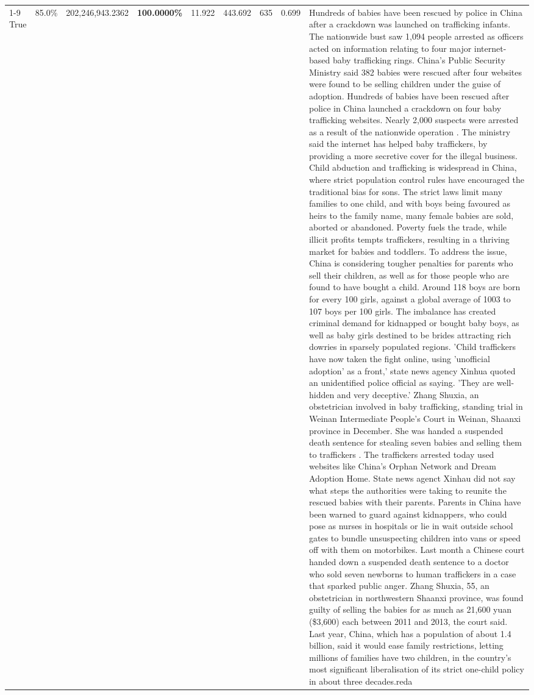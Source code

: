 \begin{table}[H]
\begin{tabular}{lllrlllll}
\cline{1-9}
True & 85.0\% & 202,246,943.2362 & \bfseries \color{red} 100.0000\% & 11.922 & 443.692 & 635 & 0.699 & Hundreds of babies have been rescued by police in China after a crackdown was launched on trafficking infants. The nationwide bust saw 1,094 people arrested as officers acted on information relating to four major internet-based baby trafficking rings. China's Public Security Ministry said 382 babies were rescued after four websites were found to be selling children under the guise of adoption. Hundreds of babies have been rescued after police in China launched a crackdown on four baby trafficking websites. Nearly 2,000 suspects were arrested as a result of the nationwide operation . The ministry said the internet has helped baby traffickers, by providing a more secretive cover for the illegal business. Child abduction and trafficking is widespread in China, where strict population control rules have encouraged the traditional bias for sons. The strict laws limit many families to one child, and with boys being favoured as heirs to the family name, many female babies are sold, aborted or abandoned. Poverty fuels the trade, while illicit profits tempts traffickers, resulting in a thriving market for babies and toddlers. To address the issue, China is considering tougher penalties for parents who sell their children, as well as for those people who are found to have bought a child. Around 118 boys are born for every 100 girls, against a global average of 1003 to 107 boys per 100 girls. The imbalance has created criminal demand for kidnapped or bought baby boys, as well as baby girls destined to be brides attracting rich dowries in sparsely populated regions. 'Child traffickers have now taken the fight online, using 'unofficial adoption' as a front,' state news agency Xinhua quoted an unidentified police official as saying. 'They are well-hidden and very deceptive.' Zhang Shuxia, an obstetrician involved in baby trafficking, standing trial in Weinan Intermediate People's Court in Weinan, Shaanxi province in December. She was handed a suspended death sentence for stealing seven babies and selling them to traffickers . The traffickers arrested today used websites like China's Orphan Network and Dream Adoption Home. State news agenct Xinhau did not say what steps the authorities were taking to reunite the rescued babies with their parents. Parents in China have been warned to guard against kidnappers, who could pose as nurses in hospitals or lie in wait outside school gates to bundle unsuspecting children into vans or speed off with them on motorbikes. Last month a Chinese court handed down a suspended death sentence to a doctor who sold seven newborns to human traffickers in a case that sparked public anger. Zhang Shuxia, 55, an obstetrician in northwestern Shaanxi province, was found guilty of selling the babies for as much as 21,600 yuan (\$3,600) each between 2011 and 2013, the court said. Last year, China, which has a population of about 1.4 billion, said it would ease family restrictions, letting millions of families have two children, in the country's most significant liberalisation of its strict one-child policy in about three decades.reda \\

\end{tabular}
\end{table}
